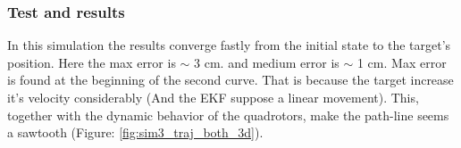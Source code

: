 
\subsubsection{Test and results}

	In this simulation the results converge fastly from the initial state to the target's position. Here the max error is $\sim$ 3 cm. and medium error is $\sim$ 1 cm. Max error is found at the beginning of the second curve. That is because the target increase it's velocity considerably (And the EKF suppose a linear movement). This, together with the dynamic behavior of the quadrotors, make the path-line seems a sawtooth (Figure: \ref{fig:sim3_traj_both_3d}).
	

